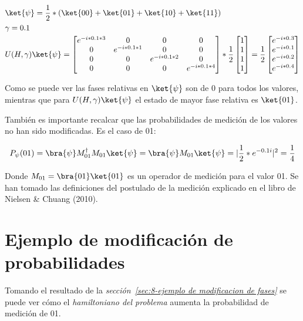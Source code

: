 \begin{align}
  &\ket{\psi} = \frac{1}{2}*(\ket{00} + \ket{01} + \ket{10} + \ket{11}) \\
  &\gamma = 0.1 \\
  &U(H, \gamma) \ket{\psi} =
    \begin{bmatrix}
      e^{-i * 0.1 * 3} & 0                & 0                & 0 \\
      0                & e^{-i * 0.1 * 1} & 0                & 0 \\
      0                & 0                & e^{-i * 0.1 * 2} & 0 \\
      0                & 0                & 0                & e^{-i * 0.1 * 4}
    \end{bmatrix}
    *\frac{1}{2}
    \begin{bmatrix}
      1 \\
      1 \\
      1 \\
      1
    \end{bmatrix} = \frac{1}{2}
    \begin{bmatrix}
      e^{-i * 0.3} \\
      e^{-i * 0.1} \\
      e^{-i * 0.2} \\
      e^{-i * 0.4}
    \end{bmatrix}
\end{align}

Como se puede ver las fases relativas  %
en $\ket{\psi}$ son de 0 para todos los valores, mientras que para $U(H, \gamma) \ket{\psi}$ el estado de mayor fase relativa es $\ket{01}$.

También es importante recalcar que las probabilidades de medición de los valores no han sido modificadas. Es el caso de 01:

\begin{align}
  P_{\psi}(01) = \bra{\psi}M_{01}^\dagger M_{01}\ket{\psi} = \bra{\psi}M_{01}\ket{\psi} = |\frac{1}{2}*e^{-0.1i}|^2 = \frac{1}{4}
\end{align}

Donde $M_{01} = \bra{01}\ket{01}$ es un operador de medición para el valor 01.
Se han tomado las definiciones del postulado de la medición explicado en el libro de Nielsen \& Chuang (2010)\cite{Nielsen_Chuang_2010}.


\section{Ejemplo de modificación de probabilidades}
Tomando el resultado de la \textit{sección~\ref{sec:8-ejemplo de modificacion de fases}} se puede ver cómo el \textit{hamiltoniano del problema} aumenta la probabilidad de medición de 01.

